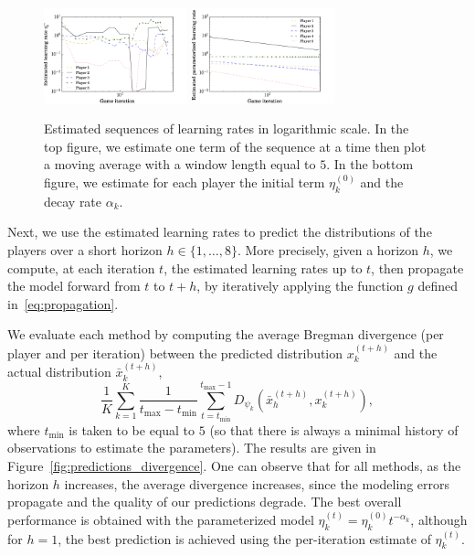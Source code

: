 \documentclass{sig-alternate-ipsn13}
\begin{document}
\begin{figure}[h!]
  \centering
  \includegraphics[width=0.37\textwidth]{images/moving_average_learning_rate.png}
  \includegraphics[width=0.37\textwidth]{images/sequence_rate.png}
  \caption{\footnotesize Estimated sequences of learning rates in logarithmic scale. In the top figure, we estimate one term of the sequence at a time then plot a moving average with a window length equal to $5$. In the bottom figure, we estimate for each player the initial term $\eta^{(0)}_k$ and the decay rate $\alpha_k$.\vspace{-.1in}}
  \label{fig:moving_average_learning_rate}
  \label{fig:sequence_rate}
\end{figure}





Next, we use the estimated learning rates to predict the distributions of the players over a short horizon $h \in \{1, \dots, 8\}$. More precisely, given a horizon $h$, we compute, at each iteration $t$, the estimated learning rates up to $t$, then propagate the model forward from $t$ to $t+h$, by iteratively applying the function $g$ defined in~\eqref{eq:propagation}.

We evaluate each method by computing the average Bregman divergence (per player and per iteration) between the predicted distribution $x^{(t+h)}_k$ and the actual distribution $\bar x^{(t+h)}_k$,
\[
\frac{1}{K} \sum_{k = 1}^K \frac{1}{t_{\max} - t_{\min}} \sum_{t = t_{\min}}^{t_{\max}-1} D_{\psi_k} (\bar x^{(t+h)}_h, x^{(t+h)}_k),
\]
where $t_{\min}$ is taken to be equal to $5$ (so that there is always a minimal history of observations to estimate the parameters). The results are given in Figure~\ref{fig:predictions_divergence}. One can observe that for all methods, as the horizon $h$ increases, the average divergence increases, since the modeling errors propagate and the quality of our predictions degrade. The best overall performance is obtained with the parameterized model $\eta^{(t)}_k = \eta^{(0)}_k t^{-\alpha_k}$, although for $h = 1$, the best prediction is achieved using the per-iteration estimate of $\eta^{(t)}_k$. 
\end{document}
